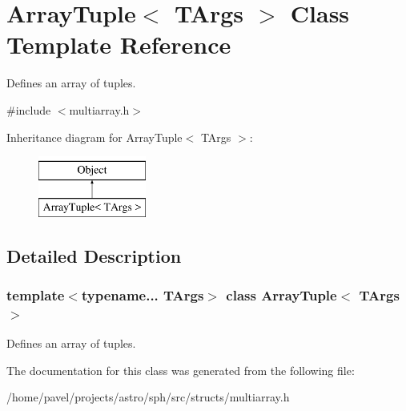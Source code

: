 \hypertarget{classArrayTuple}{}\section{Array\+Tuple$<$ T\+Args $>$ Class Template Reference}
\label{classArrayTuple}


Defines an array of tuples.  




{\ttfamily \#include $<$multiarray.\+h$>$}

Inheritance diagram for Array\+Tuple$<$ T\+Args $>$\+:\begin{figure}[H]
\begin{center}
\leavevmode
\includegraphics[height=2.000000cm]{classArrayTuple}
\end{center}
\end{figure}


\subsection{Detailed Description}
\subsubsection*{template$<$typename... T\+Args$>$\newline
class Array\+Tuple$<$ T\+Args $>$}

Defines an array of tuples. 

The documentation for this class was generated from the following file\+:\begin{DoxyCompactItemize}
\item 
/home/pavel/projects/astro/sph/src/structs/multiarray.\+h\end{DoxyCompactItemize}
